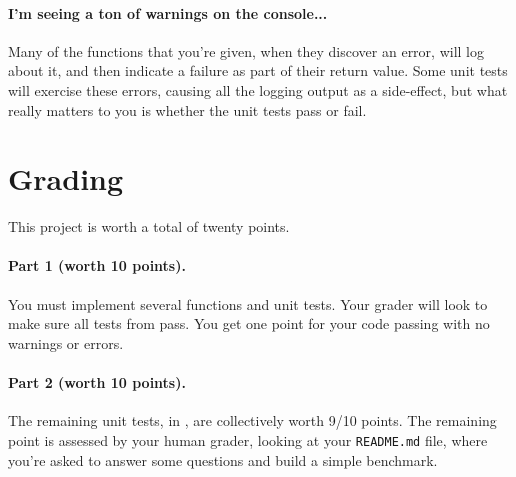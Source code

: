 \paragraph{I'm seeing a ton of warnings on the console...} Many of the
functions that you're given, when they discover an error, will
log about it, and then indicate a failure as part of their return
value. Some unit tests will exercise these errors, causing all
the logging output as a side-effect, but what really matters to
you is whether the unit tests pass or fail.

\section{Grading}

This project is worth a total of twenty points.

\paragraph{Part 1 (worth 10 points).} You must implement several functions and unit
tests. Your grader will look to make sure all tests from
 pass. You get one point for
your code passing 
with no warnings or errors.

\paragraph{Part 2 (worth 10 points).} The remaining unit tests, in
, are collectively worth
9/10 points. The remaining point is assessed by your human
grader, looking at your {\tt README.md} file, where you're
asked to answer some questions and build a simple benchmark.


